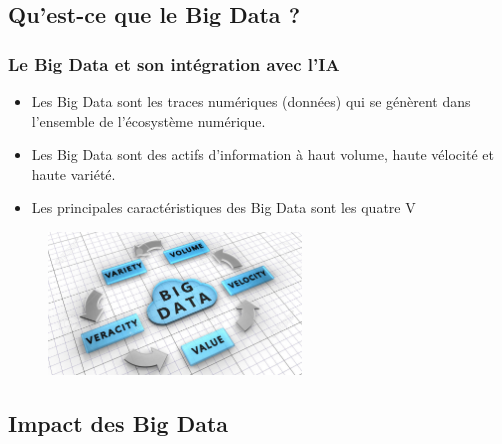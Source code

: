 \documentclass{beamer}
\begin{document}
\subsection{Qu'est-ce que le Big Data ?}
\begin{frame}
	\frametitle{Le Big Data et son intégration avec l'IA}
	
	\begin{itemize}
		\item Les Big Data sont les traces numériques (données) qui se génèrent dans l'ensemble de l'écosystème numérique.
		\item Les Big Data sont des actifs d'information à haut volume, haute vélocité et haute variété.
		
		\item Les principales caractéristiques des Big Data sont les quatre V 
	\end{itemize}
	
	\begin{figure}
		\centering
		\includegraphics[width=0.6\textwidth]{bigDa.jpg}
	\end{figure}
	
\end{frame}

\subsection{Impact des Big Data}
\end{document}
